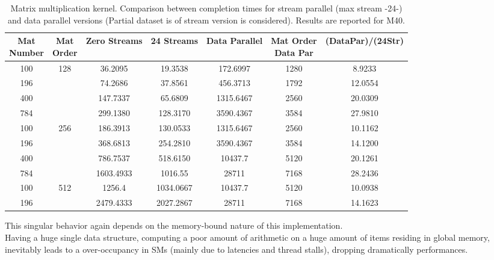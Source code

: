 \begin{itemize}
\begin{table}[!h]
\begin{tabular}{ | c  c || c | c  || c | c | c  || }
		\makecell{	Mat\\ Number}&	\makecell{Mat\\ Order}&	Zero Streams&	24 Streams&	Data Parallel& \makecell{Mat Order\\Data Par}&	(DataPar)/(24Str)\\
			\hline	\hline	
			100&	\multirow{3}{*}{128}&	36.2095&	19.3538&	172.6997&	1280&	8.9233\\
			196	& &	74.2686&	37.8561&	456.3713&	1792&	12.0554\\
			400	& &	147.7337&	65.6809&	1315.6467&	2560&	20.0309\\
			784	& &	299.1380&	128.3170&	3590.4367&	3584&	27.9810\\
			\hline
			100&	\multirow{3}{*}{256}& 186.3913&	130.0533& 1315.6467&	2560& 10.1162\\
			196& &	368.6813&	254.2810&	3590.4367&	3584&	14.1200\\
			400	& &	786.7537&	518.6150&	10437.7&	5120&	20.1261\\
			784	& &	1603.4933&	1016.55&	28711&	7168&	28.2436\\
			\hline
			100&	\multirow{1}{*}{512}&	1256.4&	1034.0667&	10437.7&	5120&	10.0938\\
			196& &	2479.4333&	2027.2867&	28711&	7168&	14.1623\\
		\hline
		\end{tabular}
		\caption{Matrix multiplication kernel. Comparison between completion times for stream parallel (max stream -24-) and data parallel versions (Partial dataset is of stream version is considered). Results are reported for M40.}	
		\label{tab:matdataparVSsmM40}		
	\end{table}
	This singular behavior again depends on the memory-bound nature of this implementation.\\
	Having a huge single data structure, computing a poor amount of arithmetic on a huge amount of items residing in global memory, inevitably leads to a over-occupancy in SMs (mainly due to latencies and thread stalls), dropping dramatically performances.
	

\end{itemize}
